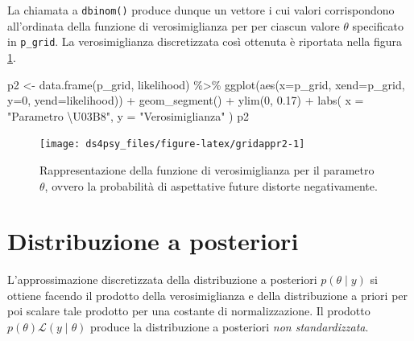 \documentclass[
  11pt,
]{krantz}
\makeatletter
\newenvironment{Shaded}{\begin{snugshade}}{\end{snugshade}}
\newcommand{\AttributeTok}[1]{\textcolor[rgb]{0.61,0.61,0.61}{#1}}
\newcommand{\DecValTok}[1]{\textcolor[rgb]{0.06,0.06,0.06}{#1}}
\newcommand{\FloatTok}[1]{\textcolor[rgb]{0.06,0.06,0.06}{#1}}
\newcommand{\FunctionTok}[1]{\textcolor[rgb]{0,0,0}{#1}}
\newcommand{\NormalTok}[1]{#1}
\newcommand{\OtherTok}[1]{\textcolor[rgb]{0.37,0.37,0.37}{#1}}
\newcommand{\SpecialCharTok}[1]{\textcolor[rgb]{0,0,0}{#1}}
\newcommand{\StringTok}[1]{\textcolor[rgb]{0.5,0.5,0.5}{#1}}
\newenvironment{kframe}{%
\medskip{}
\setlength{\fboxsep}{.8em}
 \def\at@end@of@kframe{}%
 \ifinner\ifhmode%
  \def\at@end@of@kframe{\end{minipage}}%
  \begin{minipage}{\columnwidth}%
 \fi\fi%
 \def\FrameCommand##1{\hskip\@totalleftmargin \hskip-\fboxsep
 \colorbox{shadecolor}{##1}\hskip-\fboxsep
     \hskip-\linewidth \hskip-\@totalleftmargin \hskip\columnwidth}%
 \MakeFramed {\advance\hsize-\width
   \@totalleftmargin\z@ \linewidth\hsize
   \@setminipage}}%
 {\par\unskip\endMakeFramed%
 \at@end@of@kframe}
\renewenvironment{Shaded}{\begin{kframe}}{\end{kframe}}
\theoremstyle{definition}
\theoremstyle{definition}
\theoremstyle{definition}
\theoremstyle{definition}
\theoremstyle{remark}
\makeatother
\begin{document}
La chiamata a \texttt{dbinom()} produce dunque un vettore i cui valori corrispondono all'ordinata della funzione di verosimiglianza per per ciascun valore \(\theta\) specificato in \texttt{p\_grid}. La verosimiglianza discretizzata così ottenuta è riportata nella figura \ref{fig:gridappr2}.

\begin{Shaded}
\begin{Highlighting}[]
\NormalTok{p2 }\OtherTok{\textless{}{-}} \FunctionTok{data.frame}\NormalTok{(p\_grid, likelihood) }\SpecialCharTok{\%\textgreater{}\%}
  \FunctionTok{ggplot}\NormalTok{(}\FunctionTok{aes}\NormalTok{(}\AttributeTok{x=}\NormalTok{p\_grid, }\AttributeTok{xend=}\NormalTok{p\_grid, }\AttributeTok{y=}\DecValTok{0}\NormalTok{, }\AttributeTok{yend=}\NormalTok{likelihood)) }\SpecialCharTok{+}
  \FunctionTok{geom\_segment}\NormalTok{() }\SpecialCharTok{+}
  \FunctionTok{ylim}\NormalTok{(}\DecValTok{0}\NormalTok{, }\FloatTok{0.17}\NormalTok{) }\SpecialCharTok{+}
  \FunctionTok{labs}\NormalTok{(}
    \AttributeTok{x =} \StringTok{"Parametro \textbackslash{}U03B8"}\NormalTok{,}
    \AttributeTok{y =} \StringTok{"Verosimiglianza"}
\NormalTok{  )}
\NormalTok{p2}
\end{Highlighting}
\end{Shaded}

\begin{figure}[h]

{\centering \texttt{[image: ds4psy\_files/figure-latex/gridappr2-1]} 

}

\caption{Rappresentazione della funzione di verosimiglianza per il parametro $\theta$, ovvero la probabilità di aspettative future distorte negativamente.}\label{fig:gridappr2}
\end{figure}

\hypertarget{distribuzione-a-posteriori}{%
\section{Distribuzione a posteriori}\label{distribuzione-a-posteriori}}

L'approssimazione discretizzata della distribuzione a posteriori \(p(\theta \mid y)\) si ottiene facendo il prodotto della verosimiglianza e della distribuzione a priori per poi scalare tale prodotto per una costante di normalizzazione. Il prodotto \(p(\theta)\mathcal{L}(y \mid \theta)\) produce la distribuzione a posteriori \emph{non standardizzata}.
\end{document}
